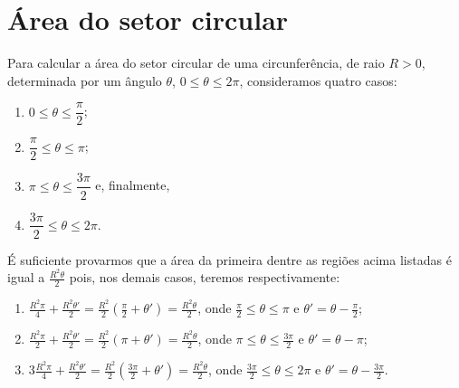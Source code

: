 \section{Área do setor circular}\label{sec:area-do-setor-circular}

Para calcular a área do setor circular de uma circunferência, de raio \(R>0\),
determinada por um ângulo \(\theta\), \(0\leqslant{\theta}\leqslant{2\pi}\),
consideramos quatro casos:

\begin{enumerate}
  \item
    \(0\leqslant{\theta}\leqslant{\dfrac{\pi}{2}}\);
  \item
    \(\dfrac{\pi}{2}\leqslant{\theta}\leqslant{\pi}\);
  \item
    \(\pi\leqslant{\theta}\leqslant{\dfrac{3\pi}{2}}\) e, finalmente,
  \item
    \(\dfrac{3\pi}{2}\leqslant{\theta}\leqslant{2\pi}\).
\end{enumerate}

É suficiente provarmos que a área da primeira dentre as regiões acima listadas é
igual a \(\frac{R^{2}\theta}{2}\) pois, nos demais casos, teremos
respectivamente:

\begin{enumerate}
  \item
    \(\frac{R^{2}\pi}{4}+\frac{R^{2}\theta'}{2}=\frac{R^{2}}{2}\left(\frac{\pi}{2}+\theta'\right)=\frac{R^{2}\theta}{2}\),
    onde \(\frac{\pi}{2}\leqslant{\theta}\leqslant{\pi}\) e \(\theta'=\theta-\frac{\pi}{2}\);
  \item
    \(\frac{R^{2}\pi}{2}+\frac{R^{2}\theta'}{2}=\frac{R^{2}}{2}\left(\pi+\theta'\right)=\frac{R^{2}\theta}{2}\),
    onde \(\pi\leqslant{\theta}\leqslant{\frac{3\pi}{2}}\) e \(\theta'=\theta-\pi\);
  \item
    \(3\frac{R^{2}\pi}{4}+\frac{R^{2}\theta'}{2}=\frac{R^{2}}{2}\left(\frac{3\pi}{2}+\theta'\right)=\frac{R^{2}\theta}{2}\),
    onde \(\frac{3\pi}{2}\leqslant{\theta}\leqslant{2\pi}\) e \(\theta'=\theta-\frac{3\pi}{2}\).
\end{enumerate}



